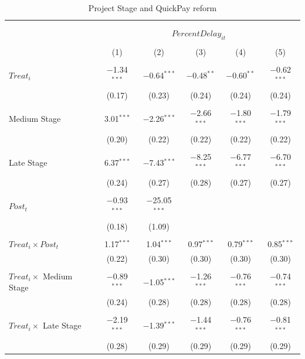 \documentclass[
]{article}
\begin{document}
\begin{table}[H] \centering 
  \caption{Project Stage and QuickPay reform} 
  \label{} 
\small 
\begin{tabular}{@{\extracolsep{-2pt}}lccccc} 
\\[-1.8ex]\hline 
\hline \\[-1.8ex] 
\\[-1.8ex] & \multicolumn{5}{c}{$PercentDelay_{it}$  } \\ 
\\[-1.8ex] & (1) & (2) & (3) & (4) & (5)\\ 
\hline \\[-1.8ex] 
 $Treat_i$ & $-$1.34$^{***}$ & $-$0.64$^{***}$ & $-$0.48$^{**}$ & $-$0.60$^{**}$ & $-$0.62$^{***}$ \\ 
  & (0.17) & (0.23) & (0.24) & (0.24) & (0.24) \\ 
  & & & & & \\ 
 Medium Stage & 3.01$^{***}$ & $-$2.26$^{***}$ & $-$2.66$^{***}$ & $-$1.80$^{***}$ & $-$1.79$^{***}$ \\ 
  & (0.20) & (0.22) & (0.22) & (0.22) & (0.22) \\ 
  & & & & & \\ 
 Late Stage & 6.37$^{***}$ & $-$7.43$^{***}$ & $-$8.25$^{***}$ & $-$6.77$^{***}$ & $-$6.70$^{***}$ \\ 
  & (0.24) & (0.27) & (0.28) & (0.27) & (0.27) \\ 
  & & & & & \\ 
 $Post_t$ & $-$0.93$^{***}$ & $-$25.05$^{***}$ &  &  &  \\ 
  & (0.18) & (1.09) &  &  &  \\ 
  & & & & & \\ 
 $Treat_i \times Post_t$ & 1.17$^{***}$ & 1.04$^{***}$ & 0.97$^{***}$ & 0.79$^{***}$ & 0.85$^{***}$ \\ 
  & (0.22) & (0.30) & (0.30) & (0.30) & (0.30) \\ 
  & & & & & \\ 
 $Treat_i \times$ Medium Stage & $-$0.89$^{***}$ & $-$1.05$^{***}$ & $-$1.26$^{***}$ & $-$0.76$^{***}$ & $-$0.74$^{***}$ \\ 
  & (0.24) & (0.28) & (0.28) & (0.28) & (0.28) \\ 
  & & & & & \\ 
 $Treat_i \times$ Late Stage & $-$2.19$^{***}$ & $-$1.39$^{***}$ & $-$1.44$^{***}$ & $-$0.76$^{***}$ & $-$0.81$^{***}$ \\ 
  & (0.28) & (0.29) & (0.29) & (0.29) & (0.29) \\ 

\end{tabular}
\end{table}
\end{document}
